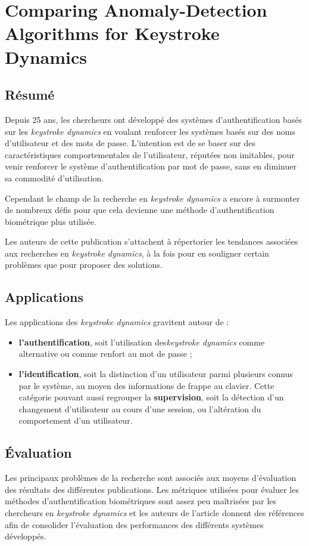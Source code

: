 \section{Comparing Anomaly-Detection Algorithms for Keystroke Dynamics\cite{peacock2004}}


\subsection{Résumé}
Depuis 25 ans, les chercheurs ont développé des systèmes d'authentification basés sur les  \textit{keystroke dynamics} en voulant renforcer les systèmes basés sur des noms d'utilisateur et des mots de passe. L'intention est de se baser sur des caractéristiques comportementales de l'utilisateur, réputées non imitables, pour venir renforcer le système d'authentification par mot de passe, sans en diminuer sa commodité d'utilisation.

Cependant le champ de la recherche en \textit{keystroke dynamics} a encore à surmonter de nombreux défis pour que cela devienne une méthode d'authentification biométrique plus utilisée.

Les auteurs de cette publication s'attachent à répertorier les tendances associées aux recherches en \textit{keystroke dynamics}, à la fois pour en souligner certain problèmes que pour proposer des solutions.

\subsection{Applications}
Les applications des \textit{keystroke dynamics} gravitent autour de :

\begin{itemize}
	\item \textbf{l'authentification}, soit l'utilisation des\textit{keystroke dynamics} comme alternative ou comme renfort au mot de passe ;
	\item \textbf{l'identification}, soit la distinction d'un utilisateur parmi plusieurs connus par le système, au moyen des informations de frappe au clavier. Cette catégorie pouvant aussi regrouper la \textbf{supervision}, soit la détection d'un changement d'utilisateur au cours d'une session, ou l'altération du comportement d'un utilisateur.
\end{itemize}

\subsection{Évaluation}
Les principaux problèmes de la recherche sont associés aux moyens d'évaluation des résultats des différentes publications. Les métriques utilisées pour évaluer les méthodes d'authentification biométriques sont assez peu maîtrisées par les chercheurs en \textit{keystroke dynamics} et les auteurs de l'article donnent des références afin de consolider l'évaluation des performances des différents systèmes développés.

